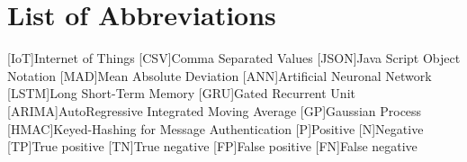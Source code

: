 \newpage





\newpage
\listoffigures


\newpage
\listoftables
\clearpage

\renewcommand\listoflistingscaption{List of source codes}
\listoflistings
\clearpage


{}
\chapter*{List of Abbreviations}
\begin{acronym}%
	[IoT]{Internet of Things}
	[CSV]{Comma Separated Values }
	[JSON]{Java Script Object Notation}
	[MAD]{Mean Absolute Deviation}
	[ANN]{Artificial Neuronal Network}
	[LSTM]{Long Short-Term Memory}
	[GRU]{Gated Recurrent Unit}
	[ARIMA]{AutoRegressive Integrated Moving Average}
	[GP]{Gaussian Process}
	[HMAC]{Keyed-Hashing for Message Authentication}
	{Positive}
	{Negative}
	[TP]{True positive}
	[TN]{True negative}
	[FP]{False positive}
	[FN]{False negative}
\end{acronym}
